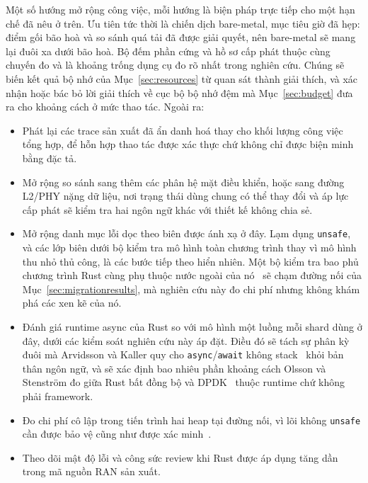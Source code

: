 Một số hướng mở rộng công việc, mỗi hướng là biện pháp trực tiếp cho một hạn chế đã nêu ở trên.
Ưu tiên tức thời là chiến dịch bare-metal, mục tiêu giờ đã hẹp: điểm gối bão hoà và so sánh quá
tải đã được giải quyết, nên bare-metal sẽ mang lại đuôi xa dưới bão hoà. Bộ đếm phần cứng và hồ sơ
cấp phát thuộc cùng chuyến đo và là khoảng trống dụng cụ đo rõ nhất trong nghiên cứu. Chúng sẽ biến
kết quả bộ nhớ của Mục~\ref{sec:resources} từ quan sát thành giải thích, và xác nhận hoặc bác bỏ
lời giải thích về cục bộ bộ nhớ đệm mà Mục~\ref{sec:budget} đưa ra cho khoảng cách ở mức thao tác.
Ngoài ra:

\begin{itemize}
\item Phát lại các trace sản xuất đã ẩn danh hoá thay cho khối lượng công việc tổng hợp, để hỗn hợp
  thao tác được xác thực chứ không chỉ được biện minh bằng đặc tả.
\item Mở rộng so sánh sang thêm các phân hệ mặt điều khiển, hoặc sang đường L2/PHY nặng dữ liệu, nơi
  trạng thái dùng chung có thể thay đổi và áp lực cấp phát sẽ kiểm tra hai ngôn ngữ khác với thiết
  kế không chia sẻ.
\item Mở rộng danh mục lỗi dọc theo biên được ánh xạ ở đây. Lạm dụng \texttt{unsafe}, và
  các lớp biên dưới bộ kiểm tra mô hình toàn chương trình thay vì mô hình thu nhỏ thủ công, là các
  bước tiếp theo hiển nhiên. Một bộ kiểm tra bao phủ chương trình Rust cùng phụ thuộc nước ngoài
  của nó~\cite{pearce2026rustmc} sẽ chạm đường nối của
  Mục~\ref{sec:migrationresults}, mà nghiên cứu này đo chi phí nhưng không khám phá các xen kẽ của
  nó.
\item Đánh giá runtime async của Rust so với mô hình một luồng mỗi shard dùng ở đây, dưới các kiểm
  soát nghiên cứu này áp đặt. Điều đó sẽ tách sự phân kỳ đuôi mà Arvidsson và Kaller quy cho
  \texttt{async}/\texttt{await} không stack~\cite{arvidsson2025async} khỏi bản thân ngôn ngữ,
  và sẽ xác định bao nhiêu phần khoảng cách Olsson và Stenstr\"om đo giữa
  Rust bất đồng bộ và DPDK~\cite{olsson2023asyncpackets} thuộc runtime chứ không phải framework.
\item Đo chi phí cô lập trong tiến trình hai heap tại đường nối, vì lõi không \texttt{unsafe} cần
  được bảo vệ cũng như
  được xác minh~\cite{rivera2021galeed,kirth2022pkrusafe}.
\item Theo dõi mật độ lỗi và công sức review khi Rust được áp dụng tăng dần trong mã nguồn RAN sản
  xuất.
\end{itemize}


